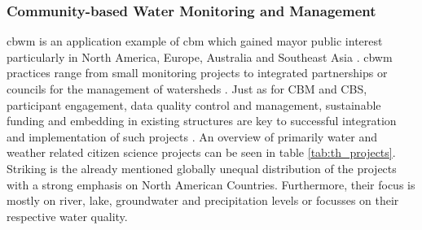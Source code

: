 \subsubsection*{Community-based Water Monitoring and Management}\label{subsubsec:cbwm}

\acrfull{cbwm} is an application example of \acrshort{cbm} which gained mayor public interest particularly in North America, Europe, Australia and Southeast Asia \autocite{kirschkeCitizenScienceProjects2022, koehlerCitizenParticipationCollaborative2008, livinglakescanadaElevatingCommunityBased2018}. \acrshort{cbwm} practices range from small monitoring projects to integrated partnerships or councils for the management of watersheds \autocite{westonCommunityBasedWaterMonitoring2015}. Just as for CBM and CBS, participant engagement, data quality control and management, sustainable funding and embedding in existing structures are key to successful integration and implementation of such projects \autocite{allenCommunityBasedWaterMonitoring2018,livinglakescanadaCommunityBasedWaterMonitoring2018,westonCommunityBasedWaterMonitoring2015}.
An overview of primarily water and weather related citizen science projects can be seen in table \ref{tab:th_projects}. Striking is the already mentioned globally unequal distribution of the projects with a strong emphasis on North American Countries. Furthermore, their focus is mostly on river, lake, groundwater and precipitation levels or focusses on their respective water quality. 

